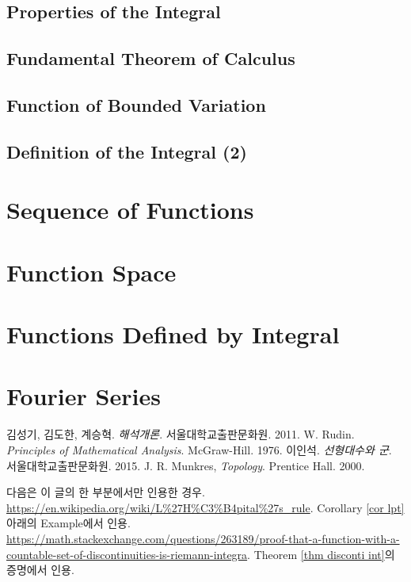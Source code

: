 \documentclass[12pt]{article}
\theoremstyle{definition}
\begin{document}
\subsection{Properties of the Integral}

\subsection{Fundamental Theorem of Calculus}

\subsection{Function of Bounded Variation}

\subsection{Definition of the Integral (2)}


\newpage

\section{Sequence of Functions} \label{sec seq of ftn}

\section{Function Space}

\section{Functions Defined by Integral}

\section{Fourier Series}


\begin{thebibliography}{99}
	
	\label{ref1} 김성기, 김도한, 계승혁. \emph{해석개론}. 서울대학교출판문화원. 2011.
	\label{ref2} W. Rudin. \emph{Principles of Mathematical Analysis}. McGraw-Hill. 1976.
	 이인석. \emph{선형대수와 군}. 서울대학교출판문화원. 2015.
	 J. R. Munkres, \emph{Topology}. Prentice Hall. 2000.
	
	다음은 이 글의 한 부분에서만 인용한 경우.
	 \url{https://en.wikipedia.org/wiki/L%27H%C3%B4pital%27s_rule}. Corollary \ref{cor lpt} 아래의 Example에서 인용.
	 \url{https://math.stackexchange.com/questions/263189/proof-that-a-function-with-a-countable-set-of-discontinuities-is-riemann-integra}. Theorem \ref{thm disconti int}의 증명에서 인용.
		
\end{thebibliography}
\end{document}
